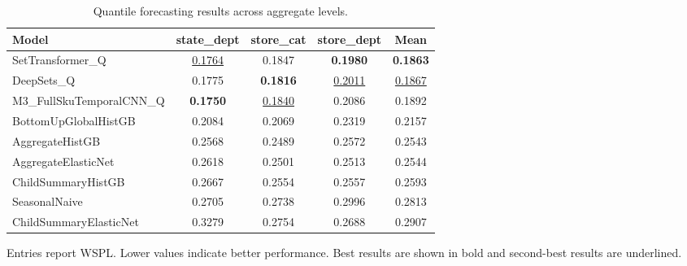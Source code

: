 \begin{table}[H]
\centering
\caption{Quantile forecasting results across aggregate levels.}
\label{tab:main_quantile}
\begin{threeparttable}
\begin{tabular}{lcccc}
\toprule
Model & state\_dept & store\_cat & store\_dept & Mean \\
\midrule
SetTransformer\_Q & \underline{0.1764} & 0.1847 & \textbf{0.1980} & \textbf{0.1863} \\
DeepSets\_Q & 0.1775 & \textbf{0.1816} & \underline{0.2011} & \underline{0.1867} \\
M3\_FullSkuTemporalCNN\_Q & \textbf{0.1750} & \underline{0.1840} & 0.2086 & 0.1892 \\
BottomUpGlobalHistGB & 0.2084 & 0.2069 & 0.2319 & 0.2157 \\
AggregateHistGB & 0.2568 & 0.2489 & 0.2572 & 0.2543 \\
AggregateElasticNet & 0.2618 & 0.2501 & 0.2513 & 0.2544 \\
ChildSummaryHistGB & 0.2667 & 0.2554 & 0.2557 & 0.2593 \\
SeasonalNaive & 0.2705 & 0.2738 & 0.2996 & 0.2813 \\
ChildSummaryElasticNet & 0.3279 & 0.2754 & 0.2688 & 0.2907 \\
\bottomrule
\end{tabular}
\begin{tablenotes}
\footnotesize \item Entries report WSPL. Lower values indicate better performance. Best results are shown in bold and second-best results are underlined.
\end{tablenotes}
\end{threeparttable}
\end{table}
